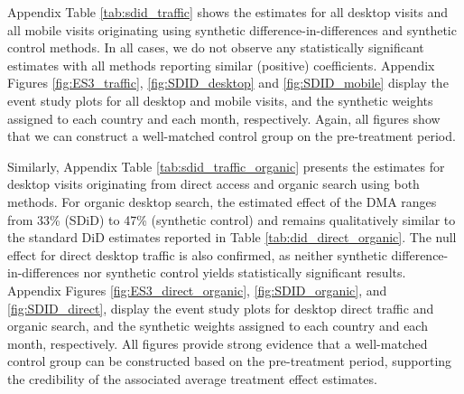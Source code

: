 \documentclass[11pt]{article}
\begin{document}
	Appendix Table \ref{tab:sdid_traffic} shows the estimates for all desktop visits and all mobile visits originating using synthetic difference-in-differences and synthetic control methods. In all cases, we do not observe any statistically significant estimates with all methods reporting similar (positive) coefficients. Appendix Figures \ref{fig:ES3_traffic}, \ref{fig:SDID_desktop} and \ref{fig:SDID_mobile}  display the event study plots for all desktop and mobile visits, and the synthetic weights assigned to each country and each month, respectively. Again, all figures show that we can construct a well-matched control group on the pre-treatment period. 
	
	
	Similarly, Appendix Table \ref{tab:sdid_traffic_organic} presents the estimates for desktop visits originating from direct access and organic search using both methods. For organic desktop search, the estimated effect of the DMA ranges from 33\% (SDiD) to 47\% (synthetic control) and remains qualitatively similar to the standard DiD estimates reported in Table \ref{tab:did_direct_organic}. The null effect for direct desktop traffic is also confirmed, as neither synthetic difference-in-differences nor synthetic control yields statistically significant results. Appendix Figures \ref{fig:ES3_direct_organic}, \ref{fig:SDID_organic}, and \ref{fig:SDID_direct},  display the event study plots for desktop direct traffic and organic search, and the synthetic weights assigned to each country and each month, respectively. All figures provide strong evidence that a well-matched control group can be constructed based on the pre-treatment period, supporting the credibility of the associated average treatment effect estimates.  
	
	
	\clearpage
	
\end{document}
